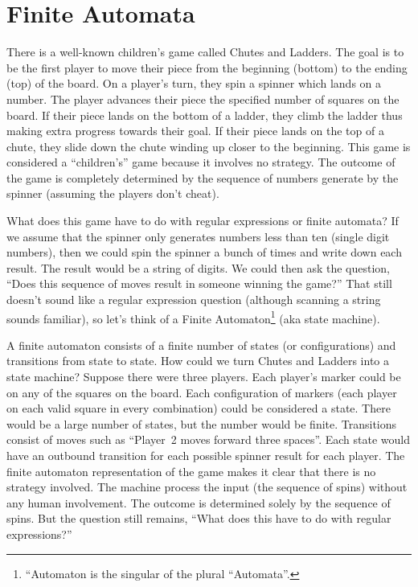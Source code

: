 \documentclass[letterpaper,12pt,openany,reqno]{book}%
\begin{document}
\chapter{Finite Automata}
There is a well-known children's game called Chutes and Ladders. The goal is to be the first player to move their piece from the beginning (bottom) to the ending (top) of the board. On a player's turn, they spin a spinner which lands on a number. The player advances their piece the specified number of squares on the board. If their piece lands on the bottom of a ladder, they climb the ladder thus making extra progress towards their goal. If their piece lands on the top of a chute, they slide down the chute winding up closer to the beginning. This game is considered a ``children's'' game because it involves no strategy. The outcome of the game is completely determined by the sequence of numbers generate by the spinner (assuming the players don't cheat).

What does this game have to do with regular expressions or finite automata? If we assume that the spinner only generates numbers less than ten (single digit numbers), then we could spin the spinner a bunch of times and write down each result. The result would be a string of digits. We could then ask the question, ``Does this sequence of moves result in someone winning the game?'' That still doesn't sound like a regular expression question (although scanning a string sounds familiar), so let's think of a Finite Automaton\footnote{``Automaton is the singular of the plural ``Automata''.} (aka state machine).

A finite automaton consists of a finite number of states (or configurations) and transitions from state to state. How could we turn Chutes and Ladders into a state machine? Suppose there were three players. Each player's marker could be on any of the squares on the board. Each configuration of markers (each player on each valid square in every combination) could be considered a state. There would be a large number of states, but the number would be finite. Transitions consist of moves such as ``Player~2 moves forward three spaces''. Each state would have an outbound transition for each possible spinner result for each player. The finite automaton representation of the game makes it clear that there is no strategy involved. The machine process the input (the sequence of spins) without any human involvement. The outcome is determined solely by the sequence of spins. But the question still remains, ``What does this have to do with regular expressions?''
\end{document}
